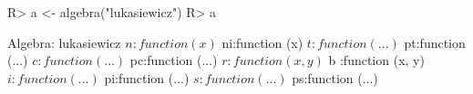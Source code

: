 \begin{Schunk}
% --begin: "lukasiewicz.algebra"
\begin{Sinput}
R> a <- algebra("lukasiewicz")
R> a
\end{Sinput}
\begin{Soutput}
Algebra: lukasiewicz 
 $ n :function (x)  
 $ ni:function (x)  
 $ t :function (...)  
 $ pt:function (...)  
 $ c :function (...)  
 $ pc:function (...)  
 $ r :function (x, y)  
 $ b :function (x, y)  
 $ i :function (...)  
 $ pi:function (...)  
 $ s :function (...)  
 $ ps:function (...)  
\end{Soutput}
% --end: "lukasiewicz.algebra"
\end{Schunk}
